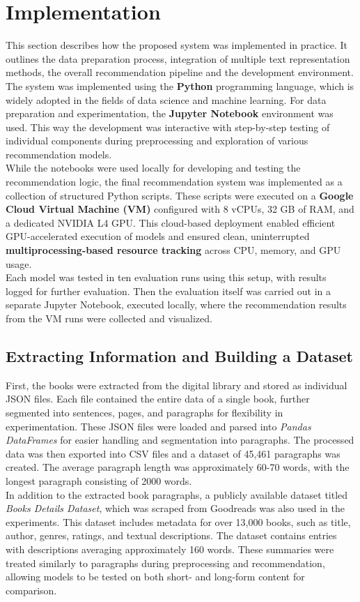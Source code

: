 \documentclass[\myFontSize,a4paper,oneside,hidelinks]{article}
\begin{document}
\clearpage{}
\section{Implementation}
This section describes how the proposed system was implemented in practice. It outlines the data preparation process, integration of multiple text representation methods, the overall recommendation pipeline and the development environment.\\
The system was implemented using the \textbf{Python} programming language, which is widely adopted in the fields of data science and machine learning. For data preparation and experimentation, the \textbf{Jupyter Notebook} environment was used. This way the development was interactive with  step-by-step testing of individual components during preprocessing and exploration of various recommendation models.\\
While the notebooks were used locally for developing and testing the recommendation logic, the final recommendation system was implemented as a collection of structured Python scripts. These scripts were executed on a \textbf{Google Cloud Virtual Machine (VM)} configured with 8 vCPUs, 32 GB of RAM, and a dedicated NVIDIA L4 GPU. 
This cloud-based deployment enabled efficient GPU-accelerated execution of models and ensured clean, uninterrupted \textbf{multiprocessing-based resource tracking} across CPU, memory, and GPU usage. \\
Each model was tested in ten evaluation runs using this setup, with results logged for further evaluation. Then the evaluation itself was carried out in a separate Jupyter Notebook, executed locally, where the recommendation results from the VM runs were collected and visualized.

\subsection{Extracting Information and Building a Dataset}
First, the books were extracted from the digital library and stored as individual JSON files. Each file contained the entire data of a single book, further segmented into sentences, pages, and paragraphs for flexibility in experimentation. These JSON files were loaded and parsed into \textit{Pandas DataFrames} for easier handling and segmentation into paragraphs. The processed data was then exported into CSV files and a dataset of 45,461 paragraphs was created. 
The average paragraph length was approximately 60-70 words, with the longest paragraph consisting of 2000 words.\\
In addition to the extracted book paragraphs, a publicly available dataset titled \textit{Books Details Dataset}, which was scraped from Goodreads \cite{goodreads_kumar_2022} was also used in the experiments. This dataset includes metadata for over 13,000 books, such as title, author, genres, ratings, and textual descriptions. The dataset contains entries with descriptions averaging approximately 160 words. These summaries were treated similarly to paragraphs during preprocessing and recommendation, allowing models to be tested on both short- and long-form content for comparison.
\end{document}
